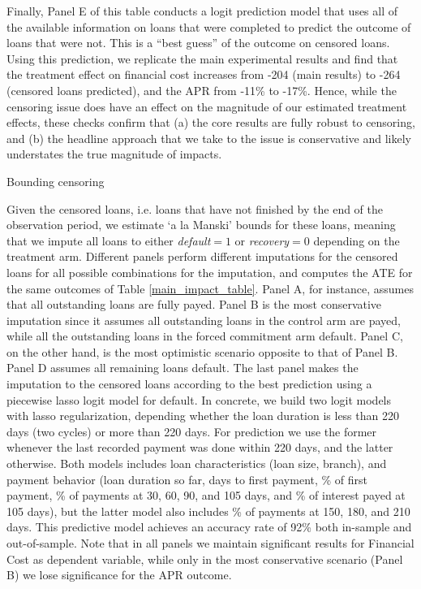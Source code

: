 \begin{appendix}
Finally, Panel E of this table conducts a logit prediction model that uses all of the available information on loans that were completed to predict the outcome of loans that were not.  This is a ``best guess'' of the outcome on censored loans.  Using this prediction, we replicate the main experimental results and find that the treatment effect on financial cost increases from -204 (main results) to -264 (censored loans predicted), and the APR from -11\% to -17\%.  Hence, while the censoring issue does have an effect on the magnitude of our estimated treatment effects, these  checks confirm that (a) the core results are fully robust to censoring, and (b) the headline approach that we take to the issue is conservative and likely understates the true magnitude of impacts.





\begin{table}[H]
\caption{Bounding censoring} 
\label{bounding_censoring}
\begin{center}
\resizebox{0.75\textwidth}{!}{
\footnotesize{}
}
\end{center}
 
\end{table}
 \footnotesize{ Given the censored loans, i.e. loans that have not finished by the end of the observation period, we estimate `a la Manski' bounds for these loans, meaning that we impute all loans to either \emph{default}$=1$ or \emph{recovery}$=0$ depending on the treatment arm. Different panels perform different imputations for the censored loans for all possible combinations for the imputation, and computes the ATE for the same outcomes of Table \ref{main_impact_table}. Panel A, for instance, assumes that all outstanding loans are fully payed. Panel B is the most conservative imputation since it assumes all outstanding loans in the control arm are payed, while all the outstanding loans in the forced commitment arm default. Panel C, on the other hand, is the most optimistic scenario opposite to that of Panel B. Panel D assumes all remaining loans default. The last panel makes the imputation to the censored loans according to the best prediction using a piecewise lasso logit model for default. In concrete, we build two logit models with lasso regularization, depending whether the loan duration is less than 220 days (two cycles) or more than 220 days. For prediction we use the former whenever the last recorded payment was done within 220 days, and the latter otherwise. Both models includes loan characteristics (loan size, branch), and payment behavior (loan duration so far, days to first payment, \% of first payment, \% of payments at 30, 60, 90, and 105 days, and \% of interest payed at 105 days), but the latter model also includes \% of payments at 150, 180, and 210 days. This predictive model achieves an accuracy rate of 92\% both in-sample and out-of-sample.
 Note that in all panels we maintain significant results for Financial Cost as dependent variable, while only in the most conservative scenario (Panel B) we lose significance for the APR outcome. }



\end{appendix}
